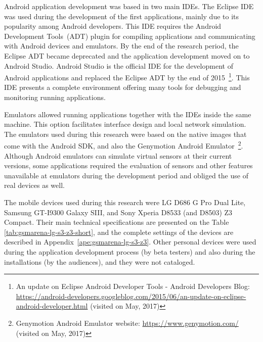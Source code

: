
Android application development was based in two main IDEs.
The Eclipse IDE was used during the development of the first applications, mainly due to its popularity among Android developers.
This IDE requires the Android Development Tools~(ADT) plugin for compiling applications and communicating with Android devices and emulators.
By the end of the research period, the Eclipse ADT became deprecated and the application development moved on to Android Studio.
Android Studio is the official IDE for the development of Android applications and replaced the Eclipse ADT by the end of 2015~\footnote{An update on Eclipse Android Developer Tools - Android Developers Blog: \url{https://android-developers.googleblog.com/2015/06/an-update-on-eclipse-android-developer.html} (visited on May, 2017)}.
This IDE presents a complete environment offering many tools for debugging and monitoring running applications.

Emulators allowed running applications together with the IDEs inside the same machine.
This option facilitates interface design and local network simulation.
The emulators used during this research were based on the native images that come with the Android SDK, and also the Genymotion Android Emulator~\footnote{Genymotion Android Emulator website: \url{https://www.genymotion.com/} (visited on May, 2017)}.
Although Android emulators can simulate virtual sensors at their current versions, some applications required the evaluation of sensors and other features unavailable at emulators during the development period and obliged the use of real devices as well.

The mobile devices used during this research were LG D686 G Pro Dual Lite, Samsung GT-I9300 Galaxy SIII, and Sony Xperia D8533 (and D8503) Z3 Compact.
Their main technical specifications are presented on the Table \ref{tab:gsmarena-lg-s3-z3-short}, and the complete settings of the devices are described in Appendix~\ref{ape:gsmarena-lg-s3-z3}.
Other personal devices were used during the application development process (by beta testers) and also during the installations (by the audiences), and they were not cataloged.

